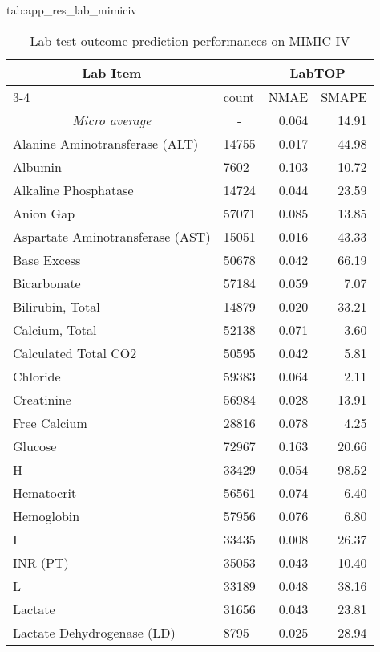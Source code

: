 \begin{table*}[t]
\floatconts
    {tab:app_res_lab_mimiciv}
    {\caption{Lab test outcome prediction performances on MIMIC-IV}}
    {\begin{tabular}{llrr}
        \toprule
        \multicolumn{1}{c}{\multirow{3}{*}{Lab Item}} &       & \multicolumn{2}{c}{LabTOP} \\
        \cmidrule{3-4}
                                                    & count &  NMAE &  SMAPE \\
        \midrule
        \multicolumn{1}{c}{\textit{Micro average}}  & \multicolumn{1}{c}{-} & 0.064 &  14.91 \\
        \midrule
        Alanine Aminotransferase (ALT) & 14755 & 0.017 & 44.98 \\
        Albumin & 7602 & 0.103 & 10.72 \\
        Alkaline Phosphatase & 14724 & 0.044 & 23.59 \\
        Anion Gap & 57071 & 0.085 & 13.85 \\
        Aspartate Aminotransferase (AST) & 15051 & 0.016 & 43.33 \\
        Base Excess & 50678 & 0.042 & 66.19 \\
        Bicarbonate & 57184 & 0.059 & 7.07 \\
        Bilirubin, Total & 14879 & 0.020 & 33.21 \\
        Calcium, Total & 52138 & 0.071 & 3.60 \\
        Calculated Total CO2 & 50595 & 0.042 & 5.81 \\
        Chloride & 59383 & 0.064 & 2.11 \\
        Creatinine & 56984 & 0.028 & 13.91 \\
        Free Calcium & 28816 & 0.078 & 4.25 \\
        Glucose & 72967 & 0.163 & 20.66 \\
        H & 33429 & 0.054 & 98.52 \\
        Hematocrit & 56561 & 0.074 & 6.40 \\
        Hemoglobin & 57956 & 0.076 & 6.80 \\
        I & 33435 & 0.008 & 26.37 \\
        INR (PT) & 35053 & 0.043 & 10.40 \\
        L & 33189 & 0.048 & 38.16 \\
        Lactate & 31656 & 0.043 & 23.81 \\
        Lactate Dehydrogenase (LD) & 8795 & 0.025 & 28.94 \\

\end{tabular}}
\end{table*}
